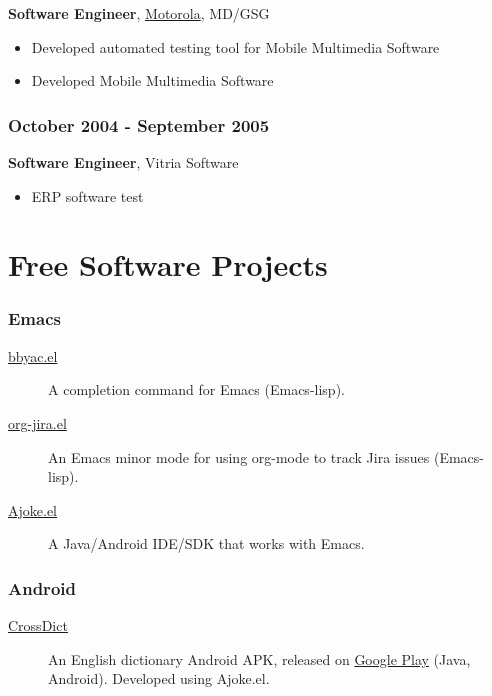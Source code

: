 \documentclass[11pt]{article}
\begin{document}
\begin{CJK*}{UTF8}{simsun}
\textbf{Software Engineer}, \href{http://motorola.com}{Motorola},  MD/GSG

\begin{itemize}
\item Developed automated testing tool for Mobile Multimedia Software

\item Developed Mobile Multimedia Software
\end{itemize}

\subsubsection{October 2004 - September 2005}
\label{sec-1-0-7}
\textbf{Software Engineer}, Vitria Software

\begin{itemize}
\item ERP software test
\end{itemize}

\section{Free Software Projects}
\label{sec-2}

\subsubsection{Emacs}
\label{sec-2-0-1}
\begin{description}
\item[{\href{http://github.com/baohaojun/bbyac}{bbyac.el}}] A completion command for Emacs (Emacs-lisp).

\item[{\href{https://github.com/baohaojun/org-jira}{org-jira.el}}] An Emacs minor mode for using org-mode to track
Jira issues (Emacs-lisp).

\item[{\href{https://github.com/baohaojun/ajoke}{Ajoke.el}}] A Java/Android IDE/SDK that works with Emacs.
\end{description}

\subsubsection{Android}
\label{sec-2-0-2}

\begin{description}
\item[{\href{https://github.com/baohaojun/BTAndroidWebViewSelection}{CrossDict}}] An English dictionary Android APK, released on \href{https://play.google.com/store/apps/details?id=com.baohaojun.crossdict}{Google
Play} (Java, Android). Developed using Ajoke.el.
\end{description}

\end{CJK*}
\end{document}
